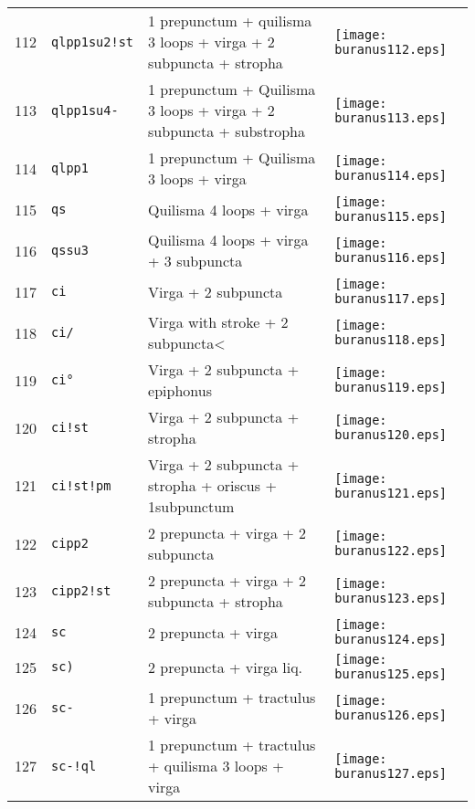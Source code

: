 \documentclass{scrarticle}
\begin{document}
\begin{longtable}{l|l|l|l}
112 & \texttt{qlpp1su2!st} & 1 prepunctum + quilisma 3 loops + virga + 2 subpuncta + stropha & \texttt{[image: buranus112.eps]} \\
113 & \texttt{qlpp1su4-} & 1 prepunctum + Quilisma 3 loops + virga + 2 subpuncta + substropha & \texttt{[image: buranus113.eps]} \\
114 & \texttt{qlpp1} & 1 prepunctum + Quilisma 3 loops + virga & \texttt{[image: buranus114.eps]} \\
115 & \texttt{qs} & Quilisma 4 loops + virga & \texttt{[image: buranus115.eps]} \\
116 & \texttt{qssu3} & Quilisma 4 loops + virga + 3 subpuncta & \texttt{[image: buranus116.eps]} \\
117 & \texttt{ci} & Virga + 2 subpuncta & \texttt{[image: buranus117.eps]} \\
118 & \texttt{ci/} & Virga with stroke + 2 subpuncta< & \texttt{[image: buranus118.eps]} \\
119 & \texttt{ci°} & Virga + 2 subpuncta + epiphonus & \texttt{[image: buranus119.eps]} \\
120 & \texttt{ci!st} & Virga + 2 subpuncta + stropha & \texttt{[image: buranus120.eps]} \\
121 & \texttt{ci!st!pm} & Virga + 2 subpuncta + stropha + oriscus + 1subpunctum & \texttt{[image: buranus121.eps]} \\
122 & \texttt{cipp2} & 2 prepuncta + virga + 2 subpuncta & \texttt{[image: buranus122.eps]} \\
123 & \texttt{cipp2!st} & 2 prepuncta + virga + 2 subpuncta + stropha & \texttt{[image: buranus123.eps]} \\
124 & \texttt{sc} & 2 prepuncta + virga & \texttt{[image: buranus124.eps]} \\
125 & \texttt{sc)} & 2 prepuncta + virga liq. & \texttt{[image: buranus125.eps]} \\
126 & \texttt{sc-} & 1 prepunctum + tractulus + virga & \texttt{[image: buranus126.eps]} \\
127 & \texttt{sc-!ql} & 1 prepunctum + tractulus + quilisma 3 loops + virga & \texttt{[image: buranus127.eps]} \\\end{longtable}
\end{document}
